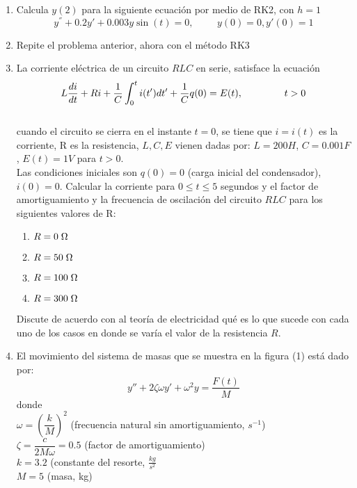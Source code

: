 \documentclass[letterpaper]{article}
\begin{document}
\begin{enumerate}
\begin{enumerate}
\end{enumerate}
\item Calcula $y(2)$ para la siguiente ecuación por medio de RK2, con $h=1$
\[ y^{''} +0.2 y{'} + 0.003 y \sin(t) = 0, \hspace{1cm} y(0)=0, y{'}(0)=1 \]
\item Repite el problema anterior, ahora con el método RK3
\item La corriente eléctrica de un circuito $RLC$ en serie, satisface la ecuación\\
\[ L \frac{di}{dt}+ Ri+ \frac{1}{C} \int_{0}^{t} i(t') dt' +\frac{1}{C}q(0)= E(t), \hspace{1.5cm} t>0 \]\\
cuando el circuito se cierra en el instante $t=0$, se tiene que $i=i(t)$ es la corriente, R es la resistencia, $L,C,E$ vienen dadas por: $L=200H$, $C=0.001F$, $E(t)=1V$ para $t>0$.\\
Las condiciones iniciales son $q(0)=0$ (carga inicial del condensador), $i(0)=0$. Calcular la corriente para $0 \leq t \leq 5$ segundos y el factor de amortiguamiento y la frecuencia de oscilación del circuito $RLC$ para los siguientes valores de R:\\
\begin{enumerate}
\item $R = 0 \hspace{0.1cm} \Omega$
\item $R = 50 \hspace{0.1cm} \Omega$
\item $R = 100 \hspace{0.1cm} \Omega$
\item $R = 300 \hspace{0.1cm} \Omega$
\end{enumerate}
Discute de acuerdo con al teoría de electricidad qué es lo que sucede con cada uno de los casos en donde se varía el valor de la resistencia $R$.
\item El movimiento del sistema de masas que se muestra en la figura (1) está dado por:
\[ y'' + 2 \zeta \omega y' + \omega^{2}y = \dfrac{F(t)}{M}\]
donde \\ 
$\omega = \left( \dfrac{k}{M} \right)^{2}$ (frecuencia natural sin amortiguamiento, $s^{-1}$) \\
$\zeta = \dfrac{c}{2M\omega}=0.5$ (factor de amortiguamiento) \\
$k = 3.2$ (constante del resorte, $\frac{kg}{s^{2}}$ \\
$M=5$ (masa, kg) \\

\end{enumerate}
\end{document}
